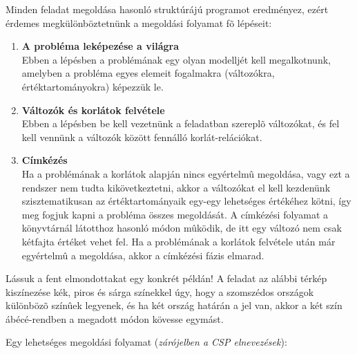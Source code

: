 Minden \clpfd feladat megoldása hasonló struktúrájú programot eredményez,
ezért érdemes megkülönböztetnünk a megoldási folyamat fõ lépéseit:

\begin{enumerate}
\item {\bf A probléma leképezése a \clpfd világra} \\
    Ebben a lépésben a problémának egy olyan modelljét kell megalkotnunk,
    amelyben a probléma egyes elemeit \clpfd fogalmakra (változókra,
    értéktartományokra) képezzük le.

\item {\bf Változók és korlátok felvétele} \\
    Ebben a lépésben be kell vezetnünk a feladatban szereplõ változókat,
    és fel kell vennünk a változók között fennálló korlát-relációkat.

\item {\bf Címkézés} \\
    Ha a problémának a korlátok alapján nincs egyértelmû megoldása, vagy
    ezt a rendszer nem tudta kikövetkeztetni, akkor a változókat el kell
    kezdenünk szisztematikusan az értéktartományaik egy-egy lehetséges
    értékéhez kötni, így meg fogjuk kapni a probléma összes megoldását.
    A címkézési folyamat a \clpb könyvtárnál látotthoz hasonló módon
    mûködik, de itt egy változó nem csak kétfajta értéket vehet fel.
    Ha a problémának a korlátok felvétele után már egyértelmû a megoldása,
    akkor a címkézési fázis elmarad.
\end{enumerate}

Lássuk a fent elmondottakat egy konkrét példán! A feladat az alábbi térkép
kiszínezése kék, piros és sárga színekkel úgy, hogy a szomszédos országok
különbözõ színûek legyenek, és ha két ország határán a \cd{<} jel van, akkor
a két szín ábécé-rendben a megadott módon kövesse egymást.

\begin{center}\end{center}

Egy lehetséges megoldási folyamat (\emph{zárójelben a CSP elnevezések}):

